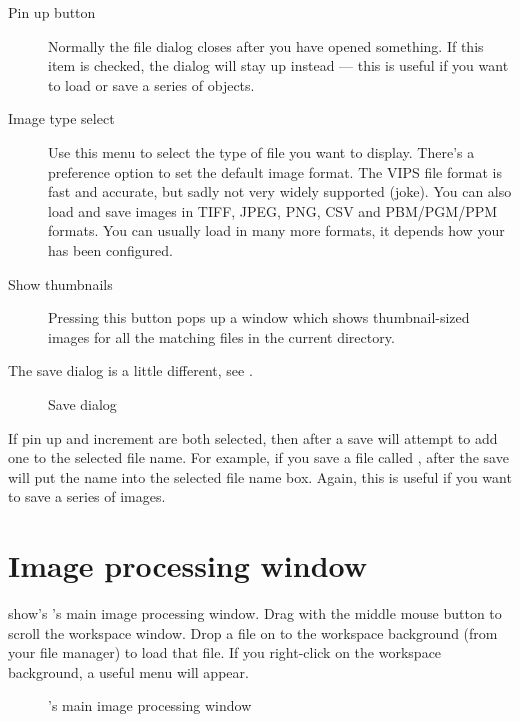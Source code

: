 \begin{description}

\item[Pin up button]
Normally the file dialog closes after you have opened something.
If this item is checked, the dialog will stay up instead --- this is useful
if you want to load or save a series of objects.

\item[Image type select]
Use this menu to select the type of file you want \nip{} to display.
There's a preference option to set the default image format.  The VIPS
file format is fast and accurate, but sadly not very widely supported
(joke). You can also load and save images in TIFF, JPEG, PNG, CSV and 
PBM/PGM/PPM formats. 
You can usually load in many more
formats, it depends how your \nip{} has been configured.

\item[Show thumbnails]
Pressing this button pops up a window which shows thumbnail-sized images
for all the matching files in the current directory.

\end{description}

The save dialog is a little different, see 
. 

\begin{figure}
\caption{Save dialog}
\end{figure}

If pin up and increment are both selected, then after a save \nip{} will
attempt to add one to the selected file name. For example, if you save a file
called , after the save \nip{} will put the name 
into the selected file name box. Again, this is useful if you want to save
a series of images.

\section{Image processing window}

 show's \nip{}'s main image processing window. Drag with the
middle mouse button to scroll the workspace window. Drop a file on to the
workspace background (from your file manager) to load that file. 
If you right-click on the workspace background, a useful menu will appear.

\begin{figure}
\caption{\nip{}'s main image processing window}
\end{figure}

